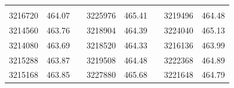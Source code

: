 \documentclass[12pt]{mwart}
\begin{document}
	\begin{table}[H]
	\centering
	\begin{tabular}{cclcclcc}
		\cellcolor[HTML]{4472C4}{\color[HTML]{FFFFFF} $t_c$ [$\mathrm{\mu s}$]} & \cellcolor[HTML]{4472C4}{\color[HTML]{FFFFFF} $C$ [$\mathrm{\mu F}$]} &  & \cellcolor[HTML]{4472C4}{\color[HTML]{FFFFFF} $t_c$ [$\mathrm{\mu s}$]} & \cellcolor[HTML]{4472C4}{\color[HTML]{FFFFFF} $C$ [$\mathrm{\mu F}$]} &  & \cellcolor[HTML]{4472C4}{\color[HTML]{FFFFFF} $t_c$ [$\mathrm{\mu s}$]} & \cellcolor[HTML]{4472C4}{\color[HTML]{FFFFFF} $C$ [$\mathrm{\mu F}$]} \\
		3216720                                                  & 464.07                                                        &  & 3225976                                                  & 465.41                                                        &  & 3219496                                                  & 464.48                                                        \\
		3214560                                                  & 463.76                                                        &  & 3218904                                                  & 464.39                                                        &  & 3224040                                                  & 465.13                                                        \\
		3214080                                                  & 463.69                                                        &  & 3218520                                                  & 464.33                                                        &  & 3216136                                                  & 463.99                                                        \\
		3215288                                                  & 463.87                                                        &  & 3219508                                                  & 464.48                                                        &  & 3222368                                                  & 464.89                                                        \\
		3215168                                                  & 463.85                                                        &  & 3227880                                                  & 465.68                                                        &  & 3221648                                                  & 464.79                                                        \\

\end{tabular}
\end{table}
\end{document}
